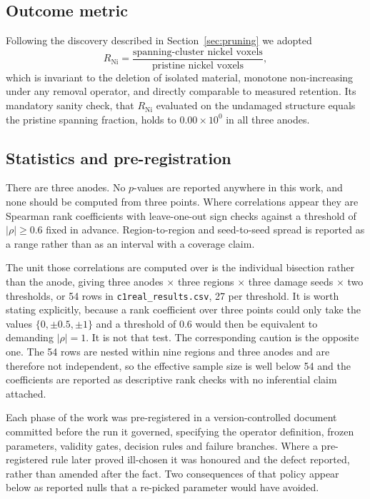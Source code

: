 \documentclass[5p,times,twocolumn]{elsarticle}
\newcommand{\Rni}{R_{\mathrm{Ni}}}
\begin{document}
\subsection{Outcome metric}
\label{sec:metric}

Following the discovery described in Section~\ref{sec:pruning} we adopted
\begin{equation}
  \Rni = \frac{\text{spanning-cluster nickel voxels}}
              {\text{pristine nickel voxels}} ,
\end{equation}
which is invariant to the deletion of isolated material, monotone
non-increasing under any removal operator, and directly comparable to measured
retention. Its mandatory sanity check, that $\Rni$ evaluated on the undamaged
structure equals the pristine spanning fraction, holds to
$0.00\times10^{0}$ in all three anodes.

\subsection{Statistics and pre-registration}

There are three anodes. No $p$-values are reported anywhere in this work, and
none should be computed from three points. Where correlations appear they are
Spearman rank coefficients with leave-one-out sign checks against a threshold
of $|\rho|\geq0.6$ fixed in advance. Region-to-region and seed-to-seed spread
is reported as a range rather than as an interval with a coverage claim.

The unit those correlations are computed over is the individual bisection
rather than the anode, giving three anodes $\times$ three regions $\times$ three
damage seeds $\times$ two thresholds, or 54 rows in
\texttt{c1real\_results.csv}, 27 per threshold. It is worth stating explicitly, because a rank coefficient over three points
could only take the values $\{0,\pm0.5,\pm1\}$ and a threshold of $0.6$ would then be equivalent to
demanding $|\rho| = 1$. It is not that test. The corresponding caution is the
opposite one. The 54 rows are nested within nine regions and three anodes and
are therefore not independent, so the effective sample size is well below 54
and the coefficients are reported as descriptive rank checks with no inferential
claim attached.

Each phase of the work was pre-registered in a version-controlled document
committed before the run it governed, specifying the operator definition,
frozen parameters, validity gates, decision rules and failure branches. Where
a pre-registered rule later proved ill-chosen it was honoured and the defect
reported, rather than amended after the fact. Two consequences of that policy
appear below as reported nulls that a re-picked parameter would have avoided.
\end{document}
